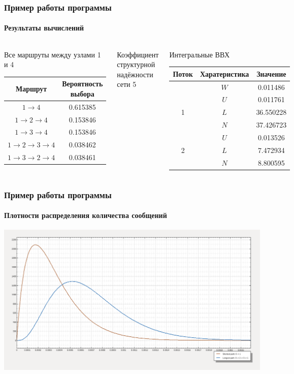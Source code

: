 \documentclass[aspectratio=169]{beamer}
\begin{document}
\begin{frame}
\frametitle{Пример работы программы}
\framesubtitle{Результаты вычислений}

\begin{columns}[t]
\begin{block}{Все маршруты между узлами 1 и 4}
\begin{tabular}{|c|c|}
\hline Маршрут & Вероятность выбора \\
\hline \( 1 \rightarrow 4 \) & 0.615385 \\
\hline \( 1 \rightarrow 2 \rightarrow 4 \) & 0.153846\\
\hline \( 1 \rightarrow 3 \rightarrow 4 \) & 0.153846\\
\hline \( 1 \rightarrow 2 \rightarrow 3 \rightarrow 4 \) & 0.038462 \\
\hline \( 1 \rightarrow 3 \rightarrow 2 \rightarrow 4 \) & 0.038461 \\
\hline
\end{tabular}
\end{block}

\begin{block}{Коэффициент структурной надёжности сети}
5
\end{block}

\begin{block}{Интегральные ВВХ}
\begin{tabular}{|c|c|c|}
\hline Поток & Харатеристика & Значение \\
\hline \cellcolor{black}		& \( W \) & 0.011486 \\

\hline \multirow{3}{*}{1} 	& \( U \) & 0.011761 \\
\hhline{~--} 				& \( L \) & 36.550228 \\
\hhline{~--} 				& \( N \) & 37.426723 \\

\hline \multirow{3}{*}{2} 	& \( U \) & 0.013526 \\
\hhline{~--} 				& \( L \) & 7.472934 \\
\hhline{~--} 				& \( N \) & 8.800595 \\
\hline
\end{tabular}
\end{block}
\end{columns}
\end{frame}

\begin{frame}
\frametitle{Пример работы программы}
\framesubtitle{Плотности распределения количества сообщений}

\includegraphics[width=.95\textwidth]{demo4_chart_2}
\end{frame}

\begin{frame}
\end{frame}
\end{document}

